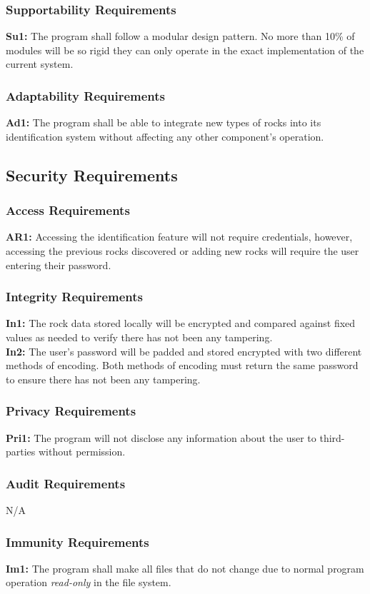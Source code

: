 \documentclass[titlepage]{article}
\begin{document}
\subsubsection{Supportability Requirements}
\textbf{Su1:} The program shall follow a modular design pattern. No more than 10\% of modules will be so rigid they can only operate in the exact implementation of the current system.
\subsubsection{Adaptability Requirements}
\textbf{Ad1:} The program shall be able to integrate new types of rocks into its identification system without affecting any other component's operation.

\subsection{Security Requirements}
\subsubsection{Access Requirements}
\textbf{AR1:} Accessing the identification feature will not require credentials, however, accessing the previous rocks discovered or adding new rocks will require the user entering their password.
\subsubsection{Integrity Requirements}
\textbf{In1:} The rock data stored locally will be encrypted and compared against fixed values as needed to verify there has not been any tampering.\\

\noindent\textbf{In2:} The user's password will be padded and stored encrypted with two different methods of encoding. Both methods of encoding must return the same password to ensure there has not been any tampering.
\subsubsection{Privacy Requirements}
\textbf{Pri1:} The program will not disclose any information about the user to third-parties without permission.
\subsubsection{Audit Requirements}
N/A
\subsubsection{Immunity Requirements}
\textbf{Im1:} The program shall make all files that do not change due to normal program operation \textit{read-only} in the file system.\\
\end{document}

